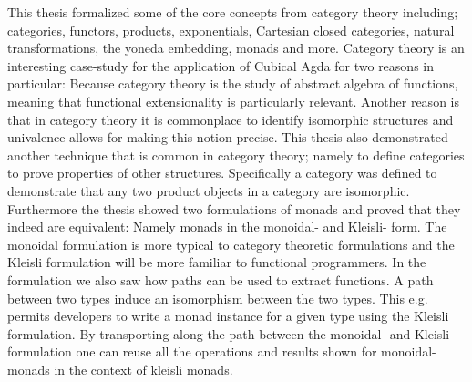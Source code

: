 This thesis formalized some of the core concepts from category theory including;
categories, functors, products, exponentials, Cartesian closed categories,
natural transformations, the yoneda embedding, monads and more. Category theory
is an interesting case-study for the application of Cubical Agda for two reasons
in particular: Because category theory is the study of abstract algebra of
functions, meaning that functional extensionality is particularly relevant.
Another reason is that in category theory it is commonplace to identify
isomorphic structures and univalence allows for making this notion precise. This
thesis also demonstrated another technique that is common in category theory;
namely to define categories to prove properties of other structures.
Specifically a category was defined to demonstrate that any two product objects
in a category are isomorphic. Furthermore the thesis showed two formulations of
monads and proved that they indeed are equivalent: Namely monads in the
monoidal- and Kleisli- form. The monoidal formulation is more typical to
category theoretic formulations and the Kleisli formulation will be more
familiar to functional programmers. In the formulation we also saw how paths can
be used to extract functions. A path between two types induce an isomorphism
between the two types. This e.g. permits developers to write a monad instance
for a given type using the Kleisli formulation. By transporting along the path
between the monoidal- and Kleisli- formulation one can reuse all the operations
and results shown for monoidal- monads in the context of kleisli monads.
